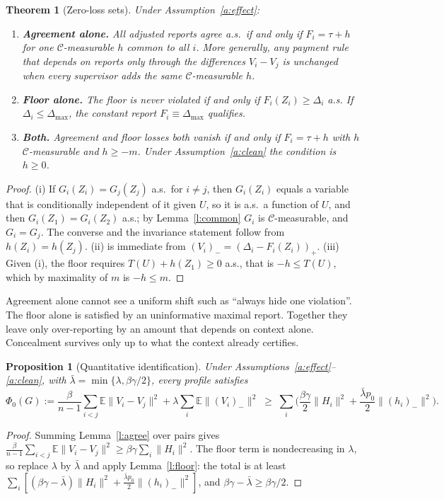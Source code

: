\documentclass[11pt]{article}
\newtheorem{theorem}{Theorem}
\newtheorem{proposition}{Proposition}
\theoremstyle{definition}
\theoremstyle{remark}
\newcommand{\E}{\mathbb{E}}
\newcommand{\cC}{\mathcal{C}}
\newcommand{\norm}[1]{\lVert #1\rVert}
\newcommand{\negp}[1]{(#1)_{-}}
\newcommand{\posp}[1]{(#1)_{+}}
\newcommand{\lbar}{\bar\lambda}
\begin{document}
\begin{theorem}[Zero-loss sets]\label{t:zero}
Under Assumption~\ref{a:effect}:
\begin{enumerate}[label=(\roman*),leftmargin=2em]
\item \textbf{Agreement alone.} All adjusted reports agree a.s.\ if and only if $F_i=\tau+h$ for one $\cC$-measurable $h$ common to all $i$. More generally, any payment rule that depends on reports only through the differences $V_i-V_j$ is unchanged when every supervisor adds the same $\cC$-measurable $h$.
\item \textbf{Floor alone.} The floor is never violated if and only if $F_i(Z_i)\ge\Delta_i$ a.s. If $\Delta_i\le\Delta_{\max}$, the constant report $F_i\equiv\Delta_{\max}$ qualifies.
\item \textbf{Both.} Agreement and floor losses both vanish if and only if $F_i=\tau+h$ with $h$ $\cC$-measurable and $h\ge -m$. Under Assumption~\ref{a:clean} the condition is $h\ge0$.
\end{enumerate}
\end{theorem}
\begin{proof}
(i) If $G_i(Z_i)=G_j(Z_j)$ a.s.\ for $i\ne j$, then $G_i(Z_i)$ equals a variable that is conditionally independent of it given $U$, so it is a.s.\ a function of $U$, and then $G_i(Z_1)=G_i(Z_2)$ a.s.; by Lemma~\ref{l:common} $G_i$ is $\cC$-measurable, and $G_i=G_j$. The converse and the invariance statement follow from $h(Z_i)=h(Z_j)$. (ii) is immediate from $\negp{V_i}=\posp{\Delta_i-F_i(Z_i)}$. (iii) Given (i), the floor requires $T(U)+h(Z_1)\ge0$ a.s., that is $-h\le T(U)$, which by maximality of $m$ is $-h\le m$.
\end{proof}

Agreement alone cannot see a uniform shift such as ``always hide one violation''. The floor alone is satisfied by an uninformative maximal report. Together they leave only over-reporting by an amount that depends on context alone. Concealment survives only up to what the context already certifies.

\begin{proposition}[Quantitative identification]\label{p:quant}
Under Assumptions~\ref{a:effect}--\ref{a:clean}, with $\lbar=\min\{\lambda,\beta\gamma/2\}$, every profile satisfies
\[
\Phi_0(G):=\frac{\beta}{n-1}\sum_{i<j}\E\norm{V_i-V_j}^2+\lambda\sum_i\E\norm{\negp{V_i}}^2
\;\ge\;\sum_{i}\Big(\frac{\beta\gamma}{2}\norm{H_i}^2+\frac{\lbar p_0}{2}\norm{\negp{h_i}}^2\Big).
\]
\end{proposition}
\begin{proof}
Summing Lemma~\ref{l:agree} over pairs gives $\frac{\beta}{n-1}\sum_{i<j}\E\norm{V_i-V_j}^2\ge\beta\gamma\sum_i\norm{H_i}^2$. The floor term is nondecreasing in $\lambda$, so replace $\lambda$ by $\lbar$ and apply Lemma~\ref{l:floor}: the total is at least $\sum_i[(\beta\gamma-\lbar)\norm{H_i}^2+\tfrac{\lbar p_0}{2}\norm{\negp{h_i}}^2]$, and $\beta\gamma-\lbar\ge\beta\gamma/2$.
\end{proof}
\end{document}
